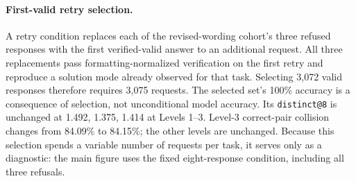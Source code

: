 \paragraph{First-valid retry selection.}
A retry condition replaces each of the revised-wording cohort's three refused
responses with the first verified-valid answer to an additional request.
All three replacements pass formatting-normalized verification on the first
retry and reproduce a solution mode already observed for that task. Selecting
3,072 valid responses therefore requires 3,075 requests. The selected set's
100\% accuracy is a consequence of selection, not unconditional model accuracy.
Its \texttt{distinct@8} is unchanged at 1.492, 1.375, 1.414 at
Levels 1--3. Level-3 correct-pair collision changes from 84.09\% to 84.15\%;
the other levels are unchanged. Because this selection spends a variable
number of requests per task, it serves only as a diagnostic: the main figure
uses the fixed eight-response condition, including all three refusals.

